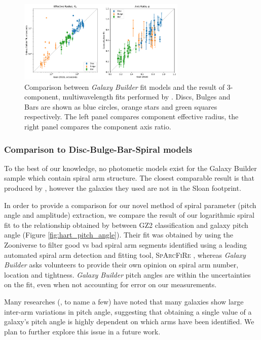 \documentclass[../main.tex]{subfiles}
\begin{document}
\begin{figure}
  \includegraphics[width=8cm]{images__results/sd_comp_comparison_fitted.pdf}
  \caption{Comparison between \textit{Galaxy Builder} fit models and the result of 3-component, multi\-wavelength fits performed by \citet{2018MNRAS.473.4731K}. Discs, Bulges and Bars are shown as blue circles, orange stars and green squares respectively. The left panel compares component effective radius, the right panel compares the component axis ratio.}
  \label{fig:sd_comp_comparison}
\end{figure}


\subsubsection{Comparison to Disc-Bulge-Bar-Spiral models}
To the best of our knowledge, no photometic models exist for the Galaxy Builder sample which contain spiral arm structure. The closest comparable result is that produced by \citet{Gao2017:1709.00746v1}, however the galaxies they used are not in the Sloan footprint.

In order to provide a comparison for our novel method of spiral parameter (pitch angle and amplitude) extraction, we compare the result of our logarithmic spiral fit to the relationship obtained by \citet{Hart2016:1607.01019v1} between GZ2 classification and galaxy pitch angle (Figure \ref{fig:hart_pitch_angle}). Their fit was obtained by using the Zooniverse to filter good vs bad spiral arm segments identified using a leading automated spiral arm detection and fitting tool, \textsc{SpArcFiRe} \citep{Davis2014:1402.1910v1}, whereas \textit{Galaxy Builder} asks volunteers to provide their own opinion on spiral arm number, location and tightness. \textit{Galaxy Builder} pitch angles are within the uncertainties on the \citet{Hart2016:1607.01019v1} fit, even when not accounting for error on our measurements.

Many researches (\citealt{Davis2014:1402.1910v1}, \citealt{2019arXiv190804246D} to name a few) have noted that many galaxies show large inter-arm variations in pitch angle, suggesting that obtaining a single value of a galaxy's pitch angle is highly dependent on which arms have been identified. We plan to further explore this issue in a future work.
\end{document}

